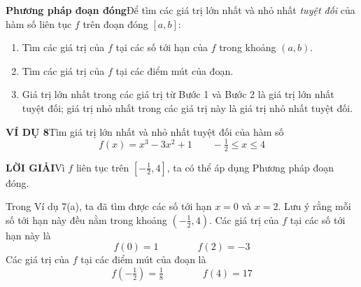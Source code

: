 \begin{minipage}[t]{0.71\textwidth}
    \vspace{5pt}
    \begin{definitionbox}
    \noindent\textbf{\color{stewartred}Phương pháp đoạn đóng}\quad Để tìm các giá trị lớn nhất và nhỏ nhất \textit{tuyệt đối} của hàm số liên tục $f$ trên đoạn đóng $[a, b]$:
    \begin{enumerate}[label=\textbf{\arabic*.}, leftmargin=1.5em, itemsep=1.5pt, parsep=0pt, topsep=2pt, partopsep=0pt]
        \item Tìm các giá trị của $f$ tại các số tới hạn của $f$ trong khoảng $(a, b)$.
        \item Tìm các giá trị của $f$ tại các điểm mút của đoạn.
        \item Giá trị lớn nhất trong các giá trị từ Bước 1 và Bước 2 là giá trị lớn nhất tuyệt đối; giá trị nhỏ nhất trong các giá trị này là giá trị nhỏ nhất tuyệt đối.
    \end{enumerate}
    \end{definitionbox}

    \vspace{9pt}
    \noindent\textbf{\textsf{\color{stewartcyan}VÍ DỤ 8}}\quad Tìm giá trị lớn nhất và nhỏ nhất tuyệt đối của hàm số
    \[
    f(x) = x^3 - 3x^2 + 1 \qquad -\tfrac{1}{2} \le x \le 4
    \]

    \vspace{3pt}
    \noindent\textbf{\textsf{\color{stewartcyan}LỜI GIẢI}}\quad Vì $f$ liên tục trên $[-\frac{1}{2}, 4]$, ta có thể áp dụng Phương pháp đoạn đóng.

    Trong Ví dụ 7(a), ta đã tìm được các số tới hạn $x = 0$ và $x = 2$. Lưu ý rằng mỗi số tới hạn này đều nằm trong khoảng $(-\frac{1}{2}, 4)$. Các giá trị của $f$ tại các số tới hạn này là
    \[
    f(0) = 1 \qquad\qquad f(2) = -3
    \]
    Các giá trị của $f$ tại các điểm mút của đoạn là
    \[
    f(-\tfrac{1}{2}) = \tfrac{1}{8} \qquad\qquad f(4) = 17
    \]
\end{minipage}
